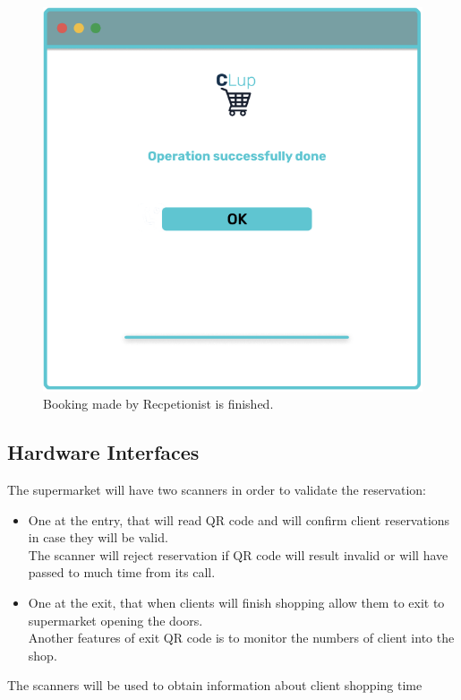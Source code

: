 \begin{figure}[H]
  \caption{Booking made by Recpetionist is finished.}
  \label{fig:Login}
  \centering
  \includegraphics[scale=0.35]{images/mockup/Done_Rec.png}

\end{figure}
\par
\pagebreak

\subsection{Hardware Interfaces}
The supermarket will have two scanners in order to validate the reservation:

\par \medskip 
\begin{itemize}
\item	One at the entry, that will read QR code and will confirm client reservations in case they will be valid. \\
The scanner will reject reservation if QR code will result invalid or will have passed to much time from its call.
\item One at the exit, that when clients will finish shopping allow them to exit to supermarket opening the doors. \\
Another features of exit QR code is to monitor the numbers of client into the shop.
\end{itemize} 
\par \medskip 
The scanners will be used to obtain information about client shopping time
